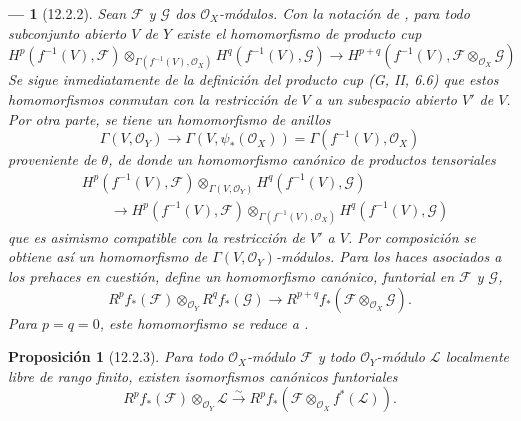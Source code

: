 \documentclass[10pt,oneside,openany]{book}
\theoremstyle{egaenv}\newtheorem*{env}{---}
\theoremstyle{egastatement}
\newtheorem*{proposition}{Proposición}
\theoremstyle{egadescription}
\newcommand{\oldpage}[2][]{\marginnote{\normalfont\scriptsize\textbf{#1}\,|\,#2}\ignorespaces}
\begin{document}
\begin{env}[12.2.2]
\label{0.12.2.2}
\label{0.12.2.2-fr}
Sean $\mathcal F$ y $\mathcal G$ dos $\mathcal O_X$-módulos.
Con la notación de , para todo subconjunto abierto $V$ de
$Y$ existe el homomorfismo de producto cup 
\[
H^p(f^{-1}(V),\mathcal F)
\otimes_{\Gamma(f^{-1}(V),\mathcal O_X)}
H^q(f^{-1}(V),\mathcal G)
\longrightarrow
H^{p+q}(f^{-1}(V),\mathcal F\otimes_{\mathcal O_X}\mathcal G)
\]
\oldpage[0\textsubscript{III}]{58}
Se sigue inmediatamente de la definición del producto cup
(G, II, 6.6) que estos homomorfismos conmutan con la restricción de
$V$ a un subespacio abierto $V'$ de $V$. Por otra parte, se tiene un homomorfismo de anillos
\[
\Gamma(V,\mathcal O_Y)\longrightarrow\Gamma(V,\psi_*(\mathcal O_X))
=\Gamma(f^{-1}(V),\mathcal O_X)
\]
proveniente de $\theta$, de donde un homomorfismo canónico de productos tensoriales
\[
\begin{aligned}
&H^p(f^{-1}(V),\mathcal F)\otimes_{\Gamma(V,\mathcal O_Y)}
H^q(f^{-1}(V),\mathcal G)\\
&\qquad\longrightarrow
H^p(f^{-1}(V),\mathcal F)
\otimes_{\Gamma(f^{-1}(V),\mathcal O_X)}
H^q(f^{-1}(V),\mathcal G)
\end{aligned}
\]
que es asimismo compatible con la restricción de $V'$ a $V$.
Por composición se obtiene así un homomorfismo de
$\Gamma(V,\mathcal O_Y)$-módulos.  Para los haces asociados a los
prehaces en cuestión, define un homomorfismo canónico,
funtorial en $\mathcal F$ y $\mathcal G$,
\[
\label{0.12.2.2.1-fr}
\tag{12.2.2.1}
R^p f_*(\mathcal F)\otimes_{\mathcal O_Y}R^q f_*(\mathcal G)
\longrightarrow
R^{p+q}f_*(\mathcal F\otimes_{\mathcal O_X}\mathcal G).
\]
Para $p=q=0$, este homomorfismo se reduce a
.
\end{env}

\begin{proposition}[12.2.3]
\label{0.12.2.3}
\label{0.12.2.3-fr}
Para todo $\mathcal O_X$-módulo $\mathcal F$ y todo $\mathcal O_Y$-módulo
$\mathcal L$ localmente libre de rango finito, existen isomorfismos canónicos
funtoriales
\[
\label{0.12.2.3.1-fr}
\tag{12.2.3.1}
R^p f_*(\mathcal F)\otimes_{\mathcal O_Y}\mathcal L
\xrightarrow{\sim}
R^p f_*(\mathcal F\otimes_{\mathcal O_X}f^*(\mathcal L)).
\]
\end{proposition}
\end{document}
